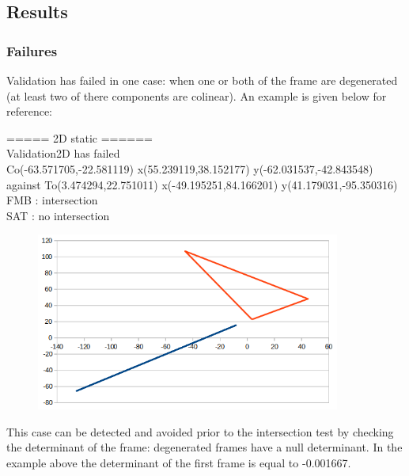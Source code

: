 \documentclass[12pt, a4paper]{article}
\begin{document}
\subsection{Results}

\subsubsection{Failures}

Validation has failed in one case: when one or both of the frame are degenerated (at least two of there components are colinear). An example is given below for reference:\\

\begin{scriptsize}
\begin{ttfamily}
===== 2D static ======\\
Validation2D has failed\\
Co(-63.571705,-22.581119) x(55.239119,38.152177) y(-62.031537,-42.843548) against To(3.474294,22.751011) x(-49.195251,84.166201) y(41.179031,-95.350316)\\
FMB : intersection\\
SAT : no intersection\\
\end{ttfamily}
\end{scriptsize}

\begin{center}
\begin{figure}[H]
\centering\includegraphics[width=10cm]{./degeneratedFrame.png}\\
\end{figure}
\end{center}

This case can be detected and avoided prior to the intersection test by checking the determinant of the frame: degenerated frames have a null determinant. In the example above the determinant of the first frame is equal to -0.001667.
\end{document}
